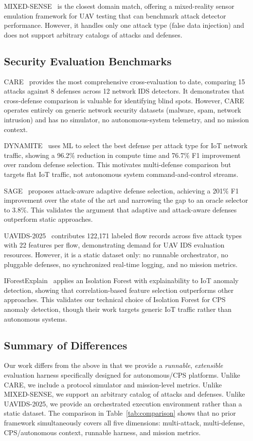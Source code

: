 MIXED-SENSE~\cite{mixedsense2025} is the closest domain match, offering
a mixed-reality sensor emulation framework for UAV testing that can
benchmark attack detector performance.  However, it handles only one
attack type (false data injection) and does not support arbitrary catalogs
of attacks and defenses.

\subsection{Security Evaluation Benchmarks}

CARE~\cite{care2024} provides the most comprehensive cross-evaluation to
date, comparing 15 attacks against 8 defenses across 12 network IDS
detectors.  It demonstrates that cross-defense comparison is valuable
for identifying blind spots.  However, CARE operates entirely on generic
network security datasets (malware, spam, network intrusion) and has no
simulator, no autonomous-system telemetry, and no mission context.

DYNAMITE~\cite{dynamite2025} uses ML to select the best defense per
attack type for IoT network traffic, showing a 96.2\% reduction in
compute time and 76.7\% F1 improvement over random defense selection.
This motivates multi-defense comparison but targets flat IoT traffic,
not autonomous system command-and-control streams.

SAGE~\cite{sage2025} proposes attack-aware adaptive defense selection,
achieving a 201\% F1 improvement over the state of the art and narrowing
the gap to an oracle selector to 3.8\%.  This validates the argument
that adaptive and attack-aware defenses outperform static approaches.

UAVIDS-2025~\cite{uavids2025} contributes 122,171 labeled flow records
across five attack types with 22 features per flow, demonstrating demand
for UAV IDS evaluation resources.  However, it is a static dataset only:
no runnable orchestrator, no pluggable defenses, no synchronized
real-time logging, and no mission metrics.

IForestExplain~\cite{iforestexplain2025} applies an Isolation Forest with
explainability to IoT anomaly detection, showing that correlation-based
feature selection outperforms other approaches.  This validates our
technical choice of Isolation Forest for CPS anomaly detection, though
their work targets generic IoT traffic rather than autonomous systems.

\subsection{Summary of Differences}

Our work differs from the above in that we provide a \emph{runnable},
\emph{extensible} evaluation harness specifically designed for
autonomous/CPS platforms.  Unlike CARE, we include a protocol simulator
and mission-level metrics.  Unlike MIXED-SENSE, we support an arbitrary
catalog of attacks and defenses.  Unlike UAVIDS-2025, we provide an
orchestrated execution environment rather than a static dataset.  The
comparison in Table~\ref{tab:comparison} shows that no prior framework
simultaneously covers all five dimensions: multi-attack, multi-defense,
CPS/autonomous context, runnable harness, and mission metrics.
